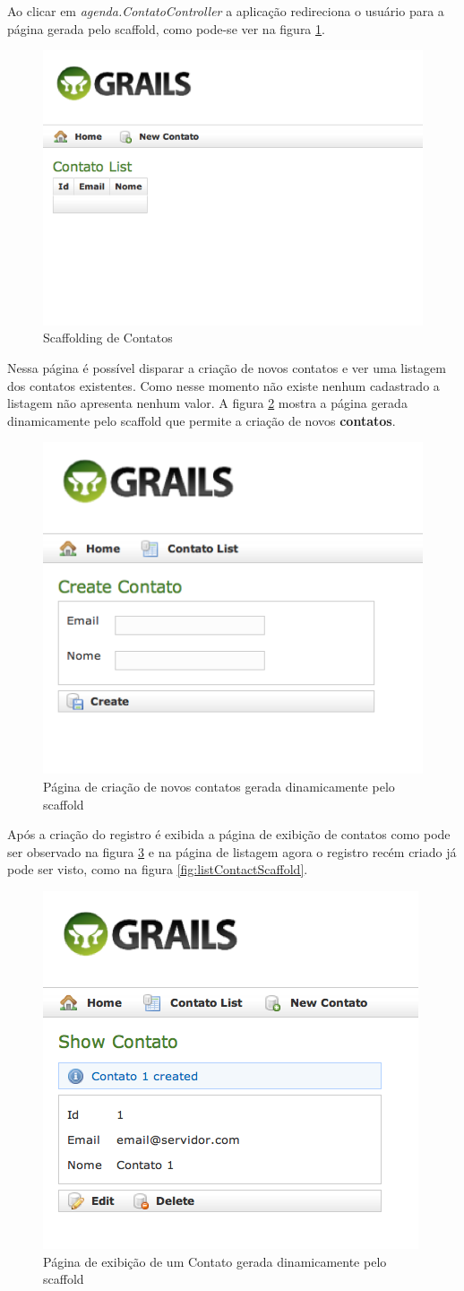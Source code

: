\documentclass[12pt]{article}
\begin{document}
   Ao clicar em \emph{agenda.ContatoController} a aplicação redireciona o usuário para
   a página gerada pelo scaffold, como pode-se ver na figura \ref{fig:contactScaffold2}.
   
   \begin{figure}[h!]
      \centering
      \includegraphics[width=.4\textwidth]{images/contactControllerScaffold2.png}
      \caption{Scaffolding de Contatos}
      \label{fig:contactScaffold2}
  \end{figure}
  
  Nessa página é possível disparar a criação de novos contatos e ver uma listagem
  dos contatos existentes. Como nesse momento não existe nenhum cadastrado a listagem
  não apresenta nenhum valor. A figura \ref{fig:createContactScaffold} mostra a 
  página gerada dinamicamente pelo scaffold que permite a criação de novos \textbf{contatos}.
  
   \begin{figure}[h!]
      \centering
      \includegraphics[width=.4\textwidth]{images/createContactScaffold.png}
      \caption{Página de criação de novos contatos gerada dinamicamente pelo scaffold}
      \label{fig:createContactScaffold}
  \end{figure}
  
  Após a criação do registro é exibida a página de exibição de contatos como pode 
  ser observado na figura \ref{fig:showContactScaffold} e na página de listagem
  agora o registro recém criado já pode ser visto, como na figura \ref{fig:listContactScaffold}.

   \begin{figure}[h!]
      \centering
      \includegraphics[width=.3\textwidth]{images/showContactScaffold.png}
      \caption{Página de exibição de um Contato gerada dinamicamente pelo scaffold}
      \label{fig:showContactScaffold}
  \end{figure}
  
\end{document}
